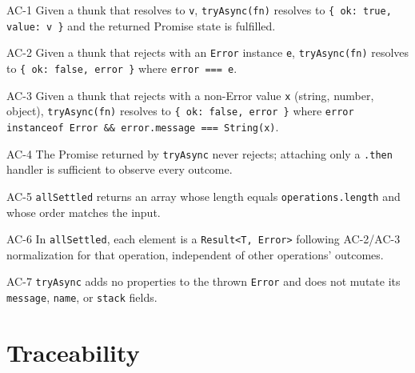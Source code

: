 \begin{ac}{AC-1}
Given a thunk that resolves to \texttt{v}, \texttt{tryAsync(fn)} resolves to \texttt{\{ ok: true, value: v \}} and the returned Promise state is fulfilled.
\end{ac}

\begin{ac}{AC-2}
Given a thunk that rejects with an \texttt{Error} instance \texttt{e}, \texttt{tryAsync(fn)} resolves to \texttt{\{ ok: false, error \}} where \texttt{error === e}.
\end{ac}

\begin{ac}{AC-3}
Given a thunk that rejects with a non-Error value \texttt{x} (string, number, object), \texttt{tryAsync(fn)} resolves to \texttt{\{ ok: false, error \}} where \texttt{error instanceof Error \&\& error.message === String(x)}.
\end{ac}

\begin{ac}{AC-4}
The Promise returned by \texttt{tryAsync} never rejects; attaching only a \texttt{.then} handler is sufficient to observe every outcome.
\end{ac}

\begin{ac}{AC-5}
\texttt{allSettled} returns an array whose length equals \texttt{operations.length} and whose order matches the input.
\end{ac}

\begin{ac}{AC-6}
In \texttt{allSettled}, each element is a \texttt{Result<T, Error>} following AC-2/AC-3 normalization for that operation, independent of other operations' outcomes.
\end{ac}

\begin{ac}{AC-7}
\texttt{tryAsync} adds no properties to the thrown \texttt{Error} and does not mutate its \texttt{message}, \texttt{name}, or \texttt{stack} fields.
\end{ac}

\section{Traceability}

